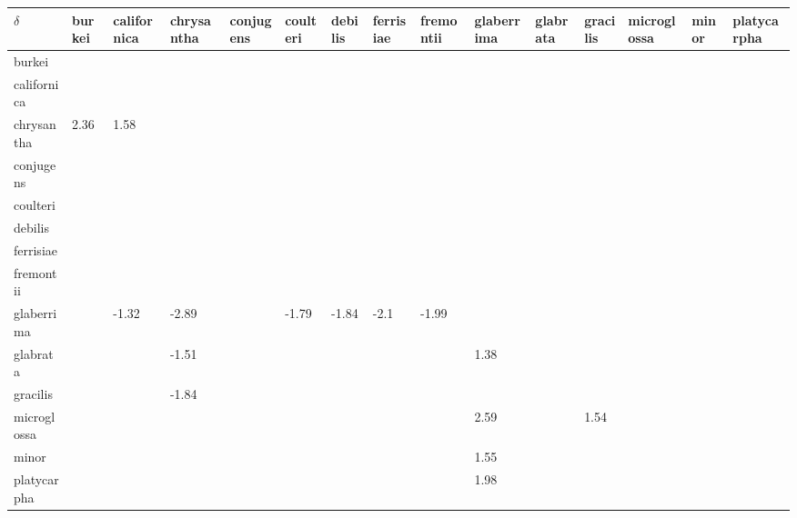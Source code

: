 \begin{table}[ht]
\centering
\begingroup\fontsize{5pt}{5pt}\selectfont
\begin{tabular}{lllllllllllllll}
  \hline
$\delta$ & burkei & californica & chrysantha & conjugens & coulteri & debilis & ferrisiae & fremontii & glaberrima & glabrata & gracilis & microglossa & minor & platycarpha \\ 
  \hline
burkei &  &  &  &  &  &  &  &  &  &  &  &  &  &  \\ 
  californica &  &  &  &  &  &  &  &  &  &  &  &  &  &  \\ 
  chrysantha & 2.36 & 1.58 &  &  &  &  &  &  &  &  &  &  &  &  \\ 
  conjugens &  &  &  &  &  &  &  &  &  &  &  &  &  &  \\ 
  coulteri &  &  &  &  &  &  &  &  &  &  &  &  &  &  \\ 
  debilis &  &  &  &  &  &  &  &  &  &  &  &  &  &  \\ 
  ferrisiae &  &  &  &  &  &  &  &  &  &  &  &  &  &  \\ 
  fremontii &  &  &  &  &  &  &  &  &  &  &  &  &  &  \\ 
  glaberrima &  & -1.32 & -2.89 &  & -1.79 & -1.84 & -2.1 & -1.99 &  &  &  &  &  &  \\ 
  glabrata &  &  & -1.51 &  &  &  &  &  & 1.38 &  &  &  &  &  \\ 
  gracilis &  &  & -1.84 &  &  &  &  &  &  &  &  &  &  &  \\ 
  microglossa &  &  &  &  &  &  &  &  & 2.59 &  & 1.54 &  &  &  \\ 
  minor &  &  &  &  &  &  &  &  & 1.55 &  &  &  &  &  \\ 
  platycarpha &  &  &  &  &  &  &  &  & 1.98 &  &  &  &  &  \\ 
   \hline
\end{tabular}
\endgroup
\end{table}
